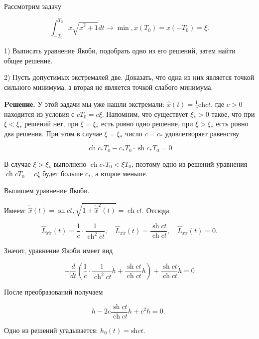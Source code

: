 \begin{task}
    Рассмотрим задачу

    $$
    \int_{-T_{0}}^{T_{0}} x \sqrt{\dot{x}^{2}+1} d t \rightarrow \min , x\left(T_{0}\right)=x\left(-T_{0}\right)=\xi .
    $$
    
    1) Выписать уравнение Якоби, подобрать одно из его решений, затем найти общее решение.
    
    2) Пусть допустимых экстремалей две. Доказать, что одна из них является точкой сильного минимума, а вторая не является точкой слабого минимума.


    \textbf{Peшение.} 
    У этой задачи мы уже нашли экстремали: $\hat{x}(t)=\frac{1}{c} \mathrm{ch} c t$, где $c>0$ находится из условия с $c T_{0}=c \xi$. Напомним, что существует $\xi_{*}>0$ такое, что при $\xi<\xi_{*}$ решений нет, при $\xi=\xi_{*}$ есть ровно одно решение, при $\xi>\xi_{*}$ есть ровно два решения. При этом в случае $\xi=\xi_{*}$ число $c=c_{*}$ удовлетворяет равенству
    
    $$
    \operatorname{ch} c_{*} T_{0}-c_{*} T_{0} \cdot \operatorname{sh} c_{*} T_{0}=0
    $$
    
    В случае $\xi>\xi_{*}$ выполнено $\operatorname{ch} c_{*} T_{0}<\xi T_{0}$, поэтому одно из решений уравнения $\operatorname{ch} c T_{0}=c \xi$ будет больше $c_{*}$, а второе меньше.
    
    Выпишем уравнение Якоби.
    
    Имеем: $\dot{\hat{x}}(t)=\operatorname{sh} c t, \sqrt{1+\dot{\hat{x}}^{2}(t)}=\operatorname{ch} c t$. Отсюда
    
    $$
    \hat{L}_{\dot{x} \dot{x}}(t)=\frac{1}{c} \cdot \frac{1}{\operatorname{ch}^{2} c t}, \quad \hat{L}_{x \dot{x}}(t)=\frac{\operatorname{sh} c t}{\operatorname{ch} c t}, \quad \hat{L}_{x x}(t)=0 .
    $$
    
    Значит, уравнение Якоби имеет вид
    
    $$
    -\frac{d}{d t}\left(\frac{1}{c} \cdot \frac{1}{\operatorname{ch}^{2} c t} \dot{h}+\frac{\operatorname{sh} c t}{\operatorname{ch} c t} h\right)+\frac{\operatorname{sh} c t}{\operatorname{ch} c t} \dot{h}=0
    $$
    
    После преобразований получаем
    
    $$
    \ddot{h}-2 c \frac{\operatorname{sh} c t}{\operatorname{ch} c t} \dot{h}+c^{2} h=0 \text {. }
    $$
    
    Одно из решений угадывается: $h_{0}(t)=\mathrm{sh} c t$.
    

\end{task}

